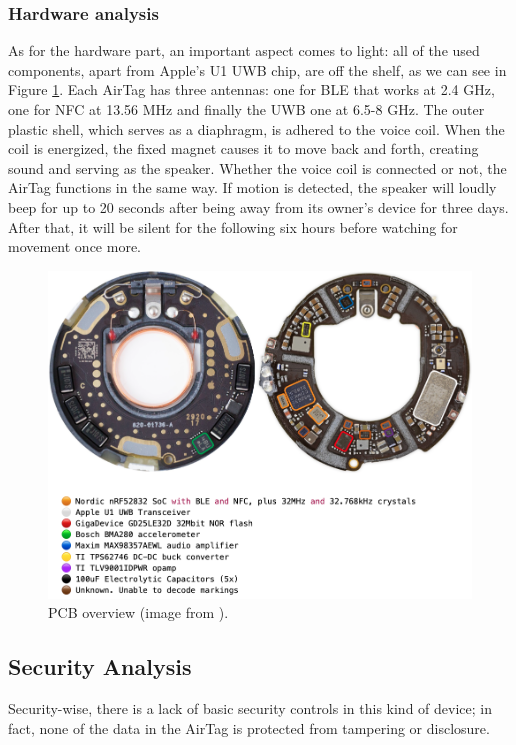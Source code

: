 \documentclass[english]{article}
\begin{document}
\subsubsection{Hardware analysis}\label{hw}
As for the hardware part, an important aspect comes to light: all of the used components, apart from Apple's U1 UWB chip, are off the shelf, as we can see in Figure \ref{img:pcb}.
Each AirTag has three antennas: one for BLE that works at 2.4 GHz, one for NFC at 13.56 MHz and finally the UWB one at 6.5-8 GHz.
The outer plastic shell, which serves as a diaphragm, is adhered to the voice coil. When the coil is energized, the fixed magnet causes it to move back and forth, creating sound and serving as the speaker.
Whether the voice coil is connected or not, the AirTag functions in the same way.
If motion is detected, the speaker will loudly beep for up to 20 seconds after being away from its owner's device for three days. After that, it will be silent for the following six hours before watching for movement once more.
\begin{figure}[ht]
	\centering
	\includegraphics[width=\textwidth]{images/pcb.png}
	\caption{PCB overview (image from \cite{reverse}). }
	\label{img:pcb}
\end{figure}

\subsection{Security Analysis}\label{sec}
Security-wise, there is a lack of basic security controls in this kind of device; in fact, none of the data in the AirTag is protected from tampering or disclosure.
\end{document}
